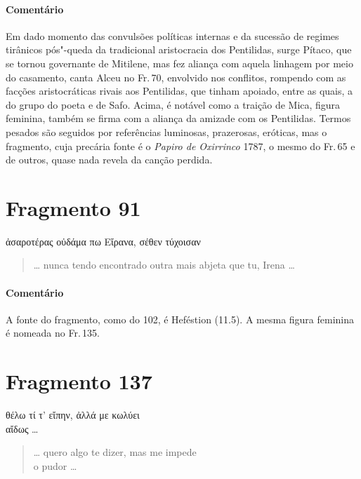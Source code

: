 {\paragraph{Comentário} Em dado momento das convulsões políticas internas e da sucessão de regimes
tirânicos pós"-queda da tradicional aristocracia dos Pentilidas, surge Pítaco, que se tornou governante de
Mitilene, mas fez aliança com aquela linhagem por meio do casamento,
canta Alceu no Fr.\,70, envolvido nos conflitos,
rompendo com as facções aristocráticas rivais aos Pentilidas, que tinham apoiado, entre as quais, a
do grupo do poeta e de Safo. Acima, é notável como a traição de 
Mica, figura feminina, também se firma com a aliança da amizade com os Pentilidas. Termos
pesados são seguidos por referências luminosas, prazerosas, eróticas, mas o
fragmento, cuja precária fonte é o \textit{Papiro de Oxirrinco} 1787, o mesmo do Fr.\,65 e de outros, quase nada revela da canção perdida.}


\pagebreak
\section{Fragmento 91}

\begin{gkverse}
ἀσαροτέρας οὐδάμα πω Εἴρανα, σέθεν τύχοισαν
\end{gkverse}

\begin{verse}
\ldots{} nunca tendo encontrado outra mais abjeta que tu, Irena \ldots{}
\end{verse}

{\paragraph{Comentário} A fonte do fragmento, como do 102, é Heféstion (11.5).
A mesma figura feminina é nomeada no Fr.\,135.}


\section{Fragmento 137}

\begin{gkverse}
θέλω τί τ’ εἴπην, ἀλλά με κωλύει\\
αἴδως \ldots{}
\end{gkverse}

\begin{verse}
\ldots{} quero algo te dizer, mas me impede\\
o pudor \ldots{}
\end{verse}

